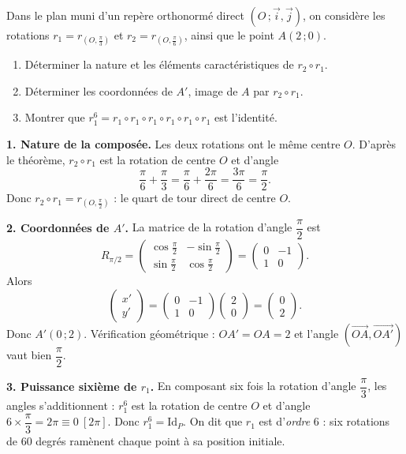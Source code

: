 \documentclass[11pt]{article}
\begin{document}
\begin{exoresolu}
Dans le plan muni d'un repère orthonormé direct $(O\,;\vec{i},\vec{j})$, on considère les rotations $r_1 = r_{\left(O,\frac{\pi}{3}\right)}$ et $r_2 = r_{\left(O,\frac{\pi}{6}\right)}$, ainsi que le point $A(2\,;0)$.
\begin{enumerate}
\item Déterminer la nature et les éléments caractéristiques de $r_2 \circ r_1$.
\item Déterminer les coordonnées de $A'$, image de $A$ par $r_2 \circ r_1$.
\item Montrer que $r_1^6 = r_1 \circ r_1 \circ r_1 \circ r_1 \circ r_1 \circ r_1$ est l'identité.
\end{enumerate}
\tcblower
\textbf{1. Nature de la composée.} Les deux rotations ont le même centre $O$. D'après le théorème, $r_2 \circ r_1$ est la rotation de centre $O$ et d'angle
\[ \frac{\pi}{6}+\frac{\pi}{3} = \frac{\pi}{6}+\frac{2\pi}{6} = \frac{3\pi}{6} = \frac{\pi}{2}. \]
Donc $r_2 \circ r_1 = r_{\left(O,\frac{\pi}{2}\right)}$ : le quart de tour direct de centre $O$.

\textbf{2. Coordonnées de $A'$.} La matrice de la rotation d'angle $\dfrac{\pi}{2}$ est
\[ R_{\pi/2} = \begin{pmatrix} \cos\frac{\pi}{2} & -\sin\frac{\pi}{2} \\ \sin\frac{\pi}{2} & \cos\frac{\pi}{2} \end{pmatrix} = \begin{pmatrix} 0 & -1 \\ 1 & 0 \end{pmatrix}. \]
Alors
\[ \begin{pmatrix} x' \\ y' \end{pmatrix} = \begin{pmatrix} 0 & -1 \\ 1 & 0 \end{pmatrix} \begin{pmatrix} 2 \\ 0 \end{pmatrix} = \begin{pmatrix} 0 \\ 2 \end{pmatrix}. \]
Donc $A'(0\,;2)$. Vérification géométrique : $OA' = OA = 2$ et l'angle $\left(\overrightarrow{OA},\overrightarrow{OA'}\right)$ vaut bien $\dfrac{\pi}{2}$.

\textbf{3. Puissance sixième de $r_1$.} En composant six fois la rotation d'angle $\dfrac{\pi}{3}$, les angles s'additionnent : $r_1^6$ est la rotation de centre $O$ et d'angle $6 \times \dfrac{\pi}{3} = 2\pi \equiv 0 \ [2\pi]$. Donc $r_1^6 = \mathrm{Id}_P$. On dit que $r_1$ est d'\emph{ordre} $6$ : six rotations de $60$ degrés ramènent chaque point à sa position initiale.
\end{exoresolu}
\end{document}
